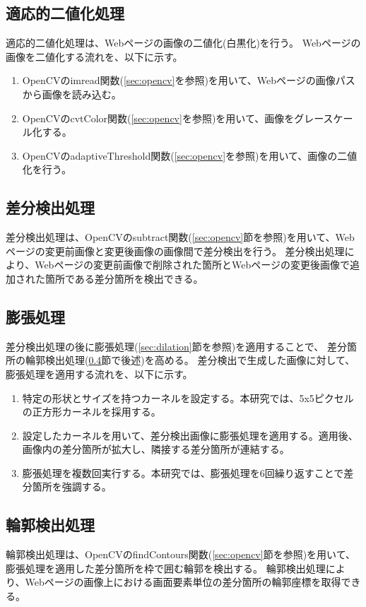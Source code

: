 \subsection{適応的二値化処理}\label{subsec:Adaptive_Binarisation}
適応的二値化処理は、Webページの画像の二値化(白黒化)を行う。
Webページの画像を二値化する流れを、以下に示す。
\begin{enumerate}
    \item OpenCVのimread関数(\ref{sec:opencv}を参照)を用いて、Webページの画像パスから画像を読み込む。
    \item OpenCVのcvtColor関数(\ref{sec:opencv}を参照)を用いて、画像をグレースケール化する。
    \item OpenCVのadaptiveThreshold関数(\ref{sec:opencv}を参照)を用いて、画像の二値化を行う。
\end{enumerate}

\subsection{差分検出処理}\label{subsec:difference_detection_process}
差分検出処理は、OpenCVのsubtract関数(\ref{sec:opencv}節を参照)を用いて、Webページの変更前画像と変更後画像の画像間で差分検出を行う。
差分検出処理により、Webページの変更前画像で削除された箇所とWebページの変更後画像で追加された箇所である差分箇所を検出できる。

\subsection{膨張処理}\label{subsec:dilation}
差分検出処理の後に膨張処理(\ref{sec:dilation}節を参照)を適用することで、
差分箇所の輪郭検出処理(\ref{subsec:contour_detection_processing}節で後述)を高める。
差分検出で生成した画像に対して、膨張処理を適用する流れを、以下に示す。
\begin{enumerate}
    \item 特定の形状とサイズを持つカーネルを設定する。本研究では、5x5ピクセルの正方形カーネルを採用する。
    \item 設定したカーネルを用いて、差分検出画像に膨張処理を適用する。適用後、画像内の差分箇所が拡大し、隣接する差分箇所が連結する。
    \item 膨張処理を複数回実行する。本研究では、膨張処理を6回繰り返すことで差分箇所を強調する。
\end{enumerate}

\subsection{輪郭検出処理}\label{subsec:contour_detection_processing}
輪郭検出処理は、OpenCVのfindContours関数(\ref{sec:opencv}節を参照)を用いて、膨張処理を適用した差分箇所を枠で囲む輪郭を検出する。
輪郭検出処理により、Webページの画像上における画面要素単位の差分箇所の輪郭座標を取得できる。

